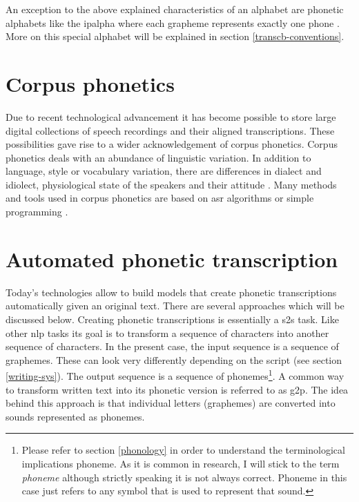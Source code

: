 
An exception to the above explained characteristics of an alphabet are phonetic alphabets like the \ac{ipalpha} where each grapheme represents exactly one phone  \citep{writing-systems}. More on this special alphabet will be explained in section \ref{transcb-conventions}.



\section{Corpus phonetics}
Due to recent technological advancement it has become possible to store large digital collections of speech recordings and their aligned transcriptions. These possibilities gave rise to a wider acknowledgement of corpus phonetics. Corpus phonetics deals with an abundance of linguistic variation. In addition to language, style or vocabulary variation, there are differences in dialect and idiolect, physiological state of the speakers and their attitude \citep{Liberman.2019, Chodroff.19.07.2019}. Many methods and tools used in corpus phonetics are based on \ac{asr} algorithms or simple programming \citep{Chodroff.19.07.2019}.

\section{Automated phonetic transcription}
Today's technologies allow to build models that create phonetic transcriptions automatically given an original text. There are several approaches which will be discussed below. Creating phonetic transcriptions is essentially a \ac{s2s} task. Like other \ac{nlp} tasks its goal is to transform a sequence of characters into another sequence of characters. In the present case, the input sequence is a sequence of graphemes. These can look very differently depending on the script (see section \ref{writing-sys}). The output sequence is a sequence of phonemes\footnote[1]{Please refer to section \ref{phonology} in order to understand the terminological implications phoneme. As it is common in research, I will stick to the term \textit{phoneme} although strictly speaking it is not always correct. Phoneme in this case just refers to any symbol that is used to represent that sound.}. A common way to transform written text into its phonetic version is referred to as \ac{g2p}. The idea behind this approach is that individual letters (graphemes) are converted into sounds represented as phonemes. 

